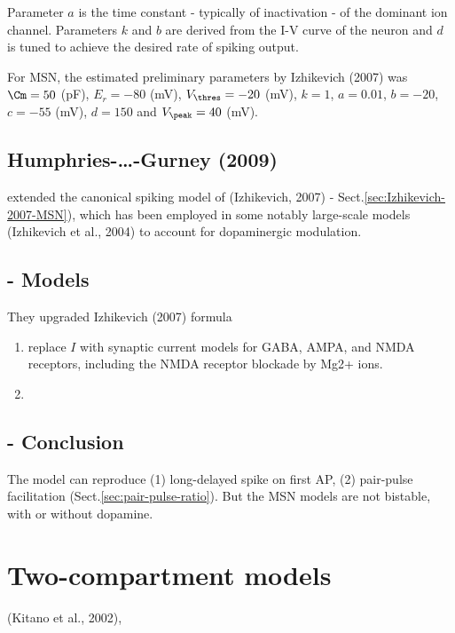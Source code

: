 Parameter $a$ is the time constant - typically of inactivation - of
the dominant ion channel. Parameters $k$ and $b$ are derived from
the I-V curve of the neuron and $d$ is tuned to achieve the desired
rate of spiking output. 

For MSN, the estimated preliminary parameters by Izhikevich (2007) was
$\Cm = 50$ (pF), $E_r = -80$ (mV), $V_\thres = -20$ (mV), $k=1$, $a=0.01$,
$b = -20$, $c=-55$ (mV), $d = 150$ and $V_\peak = 40$ (mV).



\subsection{Humphries-\ldots-Gurney (2009)}
\label{sec:MSN_HumphriesGurney2009}

\citep{humphries2009} extended the canonical spiking model of (Izhikevich, 2007)
- Sect.\ref{sec:Izhikevich-2007-MSN}), which has been employed in some notably
large-scale models (Izhikevich et al., 2004) to account for dopaminergic
modulation.


\subsection{- Models}

They upgraded Izhikevich (2007) formula 
\begin{enumerate}
  \item replace $I$ with synaptic current
models for GABA, AMPA, and NMDA receptors, including
the NMDA receptor blockade by Mg2+ ions.

  \item 
\end{enumerate}



\subsection{- Conclusion}

The model can reproduce (1) long-delayed spike on first AP, (2) pair-pulse
facilitation (Sect.\ref{sec:pair-pulse-ratio}). But the MSN models are not
bistable, with or without dopamine.


\section{Two-compartment models}

(Kitano et al., 2002),

